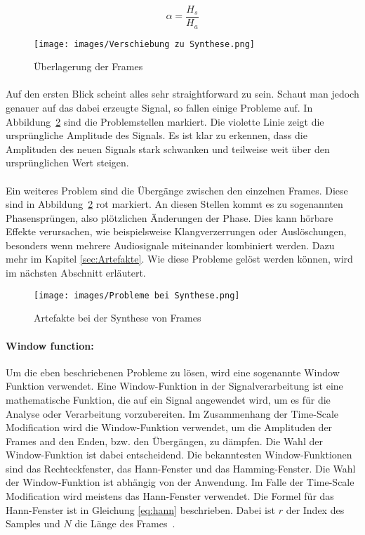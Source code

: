 \begin{equation} \label{eq:streching_factor}
    \alpha = \frac{H_s}{H_a}
\end{equation}

\begin{figure}[H]
    \centering
    \texttt{[image: images/Verschiebung zu Synthese.png]}
    \caption{Überlagerung der Frames}
    \label{fig:überlagerung}
\end{figure}

\paragraph{}
Auf den ersten Blick scheint alles sehr straightforward zu sein. Schaut man jedoch genauer auf das dabei erzeugte Signal, so fallen einige Probleme auf. In Abbildung~\ref{fig:artefakte-ola} sind die Problemstellen markiert. Die violette Linie zeigt die ursprüngliche Amplitude des Signals. Es ist klar zu erkennen, dass die Amplituden des neuen Signals stark schwanken und teilweise weit über den ursprünglichen Wert steigen.

\paragraph{}
Ein weiteres Problem sind die Übergänge zwischen den einzelnen Frames. Diese sind in Abbildung~\ref{fig:artefakte-ola} rot markiert. An diesen Stellen kommt es zu sogenannten Phasensprüngen, also plötzlichen Änderungen der Phase. Dies kann hörbare Effekte verursachen, wie beispielsweise Klangverzerrungen oder Auslöschungen, besonders wenn mehrere Audiosignale miteinander kombiniert werden. Dazu mehr im Kapitel \ref{sec:Artefakte}. Wie diese Probleme gelöst werden können, wird im nächsten Abschnitt erläutert.


\begin{figure}[H]
    \centering
    \texttt{[image: images/Probleme bei Synthese.png]}
    \caption{Artefakte bei der Synthese von Frames}
    \label{fig:artefakte-ola}
\end{figure}


\paragraph{Window function:}
Um die eben beschriebenen Probleme zu lösen, wird eine sogenannte Window Funktion verwendet. Eine Window-Funktion in der Signalverarbeitung ist eine mathematische Funktion, die auf ein Signal angewendet wird, um es für die Analyse oder Verarbeitung vorzubereiten. Im Zusammenhang der Time-Scale Modification wird die Window-Funktion verwendet, um die Amplituden der Frames and den Enden, bzw. den Übergängen, zu dämpfen. Die Wahl der Window-Funktion ist dabei entscheidend. Die bekanntesten Window-Funktionen sind das Rechteckfenster, das Hann-Fenster und das Hamming-Fenster. Die Wahl der Window-Funktion ist abhängig von der Anwendung. Im Falle der Time-Scale Modification wird meistens das Hann-Fenster verwendet. Die Formel für das Hann-Fenster ist in Gleichung \eqref{eq:hann} beschrieben. Dabei ist $r$ der Index des Samples und $N$ die Länge des Frames~\cite{christensen2019introduction}.

